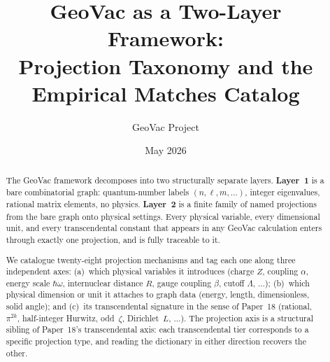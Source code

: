 \documentclass[11pt]{article}
\title{GeoVac as a Two-Layer Framework:\\
Projection Taxonomy and the Empirical Matches Catalog}
\author{GeoVac Project}
\date{May 2026}
\begin{document}
\maketitle

\begin{abstract}
The GeoVac framework decomposes into two structurally separate
layers.  \textbf{Layer~1} is a bare combinatorial graph: quantum-number
labels $(n,\ell,m,\ldots)$, integer eigenvalues, rational matrix
elements, no physics.  \textbf{Layer~2} is a finite family of named
projections from the bare graph onto physical settings.  Every
physical variable, every dimensional unit, and every transcendental
constant that appears in any GeoVac calculation enters through
exactly one projection, and is fully traceable to it.

We catalogue twenty-eight projection mechanisms and tag each one along
three independent axes: (a)~which physical variables it introduces
(charge $Z$, coupling $\alpha$, energy scale $\hbar\omega$, internuclear
distance $R$, gauge coupling $\beta$, cutoff $\Lambda$, $\ldots$);
(b)~which physical dimension or unit it attaches to graph data
(energy, length, dimensionless, solid angle); and (c)~its
transcendental signature in the sense of Paper~18 (rational, $\pi^{2k}$,
half-integer Hurwitz, odd~$\zeta$, Dirichlet~$L$, $\ldots$).  The
projection axis is a structural sibling of Paper~18's transcendental
axis: each transcendental tier corresponds to a specific projection
type, and reading the dictionary in either direction recovers the
other.


\end{abstract}
\end{document}

